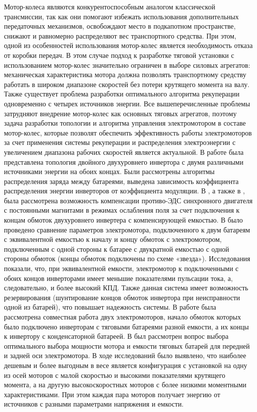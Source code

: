 
{\actuality} 
Мотор-колеса являются конкурентоспособным аналогом классической трансмиссии, так как они помогают избежать использования дополнительных передаточных механизмов, освобождают место в подкапотном пространстве, снижают и равномерно распределяют вес транспортного средства. 
При этом, одной из особенностей использования мотор-колес является необходимость отказа от коробки передач. В этом случае подход к разработке тяговой установки с использованием мотор-колес значительно ограничен в выборе силовых агрегатов: механическая характеристика мотора должна позволять транспортному средству работать в широком диапазоне скоростей без потери крутящего момента на валу. Также существует проблема разработки оптимального алгоритма рекуперации одновременно с четырех источников энергии. Все вышеперечисленные проблемы затрудняют внедрение мотор-колес как основных тяговых агрегатов, поэтому задача разработки топологии и алгоритма управления электромотором в составе мотор-колес, которые позволят обеспечить эффективность работы электромоторов за счет применения системы рекуперации и распределения электроэнергии с увеличением диапазона рабочих скоростей является актуальной.
В работе \cite{Casadei} была представлена топология двойного двухуровнего инвертора с двумя различными источниками энергии на обоих концах. Были рассмотрены алгоритмы распределения заряда между батареями, выведена зависимость коэффициента распределения энергии инверторов от коэффициента модуляции. В \cite{Sun}, а также в \cite{leey}, была рассмотрена возможность компенсации противо-ЭДС  синхронного двигателя с постоянными магнитами  в режимах ослабления поля за счет подключения к концам обмоток двухуровнего инвертера с компенсирующей емкостью. В \cite{Loncarski} было проведено сравнение параметров электромотора, подключенного к двум батареям с эквивалентной емкостью к началу и концу обмоток с электромотором, подключенным с одной стороны к батарее с двукратной емкостью с одной стороны обмоток (концы обмоток подключены по схеме «звезда»). Исследования показали, что, при эквивалентной емкости, электромотор к подключенными с обоих концов инверторами имеет меньшие показателями пульсации тока, а, следовательно, и более высокий КПД. Также данная система имеет возможность резервирования (шунтирование концов обмоток инвертора при неисправности одной из батарей), что повышает надежность системы. В работе \cite{Attaianese} была  рассмотрена совместная работа двух электромоторов, начало обмоток которых было подключено инверторам с тяговыми батареями разной емкости, а их концы к инвертору с конденсаторной батареей. В \cite{Cordopatri} был рассмотрен вопрос выбора оптимального выбора мощности мотора и емкости тяговых батарей для передней и задней оси электромотора. В ходе исследований было выявлено, что наиболее дешевым и более выгодным в весе является конфигурация с установкой на одну из осей моторов с малой скоростью и высокими показателями крутящего момента, а на другую высокоскоростных моторов с более низкими моментными характеристиками. При этом каждая пара моторов получает энергию от источников с разными параметрами напряжения и емкости.
